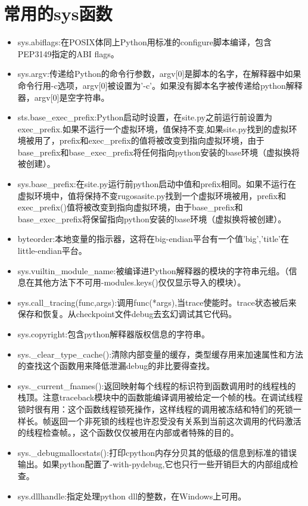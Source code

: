 \section{常用的sys函数}
\begin{itemize}
\item sys.abiflags:在POSIX体同上Python用标准的configure脚本编译，包含PEP3149指定的ABI flags。
\item sys.argv:传递给Python的命令行参数，argv[0]是脚本的名字，在解释器中如果命令行用-c选项，argv[0]被设置为'-c'。如果没有脚本名字被传递给python解释器，argv[0]是空字符串。
\item sts.base\_exec\_prefix:Python启动时设置，在site.py之前运行前设置为exec\_prefix.如果不运行一个虚拟环境，值保持不变,如果site.py找到的虚拟环境被用了，prefix和exec\_prefix的值将被改变到指向虚拟环境，由于base\_prefix和base\_exec\_prefix将任何指向python安装的base环境（虚拟换将被创建）。
\item sys.base\_prefix:在site.py运行前python启动中值和prefix相同。如果不运行在虚拟环境中，值将保持不变rugosasite.py找到一个虚拟环境被用，prefix和exec\_prefix()值将被改变到指向虚拟环境，由于base\_prefix和base\_exec\_prefix将保留指向python安装的base环境（虚拟换将被创建）。
\item byteorder:本地变量的指示器，这将在big-endian平台有一个值'big','title'在little-endian平台。
\item sys.vuiltin\_module\_name:被编译进Python解释器的模块的字符串元组。（信息在其他方法下不可用-modules.keys()仅仅显示导入的模块）。
\item sys.call\_tracing(func,args):调用func(*args),当trace使能时。trace状态被后来保存和恢复。从checkpoint文件debug去玄幻调试其它代码。
\item sys.copyright:包含python解释器版权信息的字符串。
\item sys.\_clear\_type\_cache():清除内部变量的缓存，类型缓存用来加速属性和方法的查找这个函数用来降低泄漏debug的非比要得查找。
\item sys.\_current\_fnames():返回映射每个线程的标识符到函数调用时的线程栈的栈顶。注意traceback模块中的函数能编译调用被给定一个帧的栈。在调试线程锁时很有用：这个函数线程锁死操作，这样线程的调用被冻结和特们的死锁一样长。帧返回一个非死锁的线程也许忍受没有关系到当前这次调用的代码激活的线程检查帧。，这个函数仅仅被用在内部或者特殊的目的。
\item sys.\_debugmallocstats():打印cpython内存分贝其的低级的信息到标准的错误输出。如果python配置了-with-pydebug,它也只行一些开销巨大的内部组成检查。
\item sys.dllhandle:指定处理python dll的整数，在Windows上可用。

\end{itemize}
